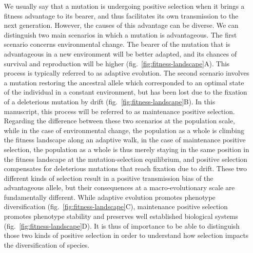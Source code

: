 \documentclass{article}
\begin{document}
    We usually say that a mutation is undergoing positive selection when it brings a fitness advantage to its bearer, and thus facilitates its own transmission to the next generation.
    However, the causes of this advantage can be diverse.
    We can distinguish two main scenarios in which a mutation is advantageous.
    The first scenario concerns environmental change.
    The bearer of the mutation that is advantageous in a new environment will be better adapted, and its chances of survival and reproduction will be higher (fig.~\ref{fig:fitness-landscape}A).
    This process is typically referred to as adaptive evolution.
    The second scenario involves a mutation restoring the ancestral allele which corresponded to an optimal state of the individual in a constant environment, but has been lost due to the fixation of a deleterious mutation by drift (fig.~\ref{fig:fitness-landscape}B).
    In this manuscript, this process will be referred to as maintenance positive selection.
    Regarding the difference between these two scenarios at the population scale, while in the case of environmental change, the population as a whole is climbing the fitness landscape along an adaptive walk\cite{tenaillon_utility_2014}, in the case of maintenance positive selection, the population as a whole is thus merely staying in the same position in the fitness landscape at the mutation-selection equilibrium, and positive selection compensates for deleterious mutations that reach fixation due to drift\cite{sella_application_2005, mustonen_fitness_2009}.
    These two different kinds of selection result in a positive transmission bias of the advantageous allele, but their consequences at a macro-evolutionary scale are fundamentally different.
    While adaptive evolution promotes phenotype diversification (fig.~\ref{fig:fitness-landscape}C), maintenance positive selection promotes phenotype stability and preserves well established biological systems (fig.~\ref{fig:fitness-landscape}D).
    It is thus of importance to be able to distinguish those two kinds of positive selection in order to understand how selection impacts the diversification of species.
\end{document}
